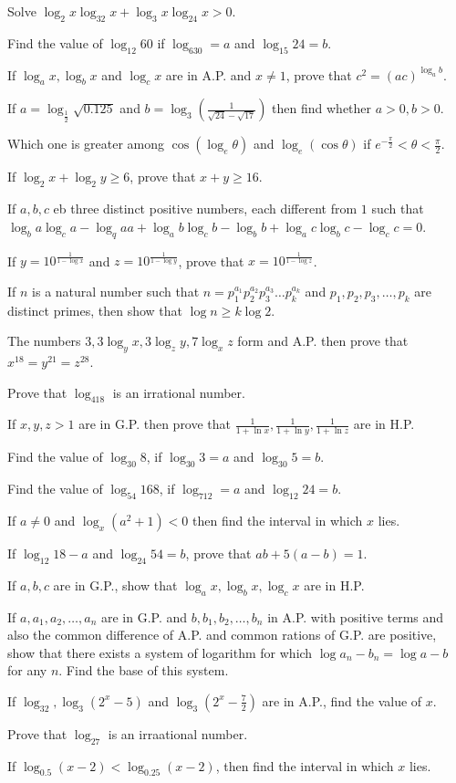 \item Solve $\log_2x\log_32x + \log_3x\log_24x > 0$.
\item Find the value of $\log_{12}60$ if $\log_630 = a$ and $\log_{15}24 = b$.
\item If $\log_ax, \log_bx$ and $\log_cx$ are in A.P. and $x\neq 1$, prove that $c^2 = (ac)^{\log_ab}$.
\item If $a = \log_{\frac{1}{2}}\sqrt{0.125}$ and $b = \log_3\left(\frac{1}{\sqrt{24} - \sqrt{17}}\right)$ then find whether $a >0,
  b> 0$.
\item Which one is greater among $\cos(\log_e\theta)$ and $\log_e(\cos\theta)$ if $e^{-\frac{\pi}{2}} < \theta < \frac{\pi}{2}$.
\item If $\log_2x + \log_2y \geq 6$, prove that $x + y\geq 16$.
\item If $a,b,c$ eb three distinct positive numbers, each different from $1$ such that $\log_ba\log_ca - \log_qaa + \log_ab\log_cb
  - \log_bb + \log_ac\log_bc - \log_cc = 0$.
\item If $y = 10^{\frac{1}{1 - \log x}}$ and $z = 10^{\frac{1}{1 - \log y}}$, prove that $x = 10^{\frac{1}{1 - \log z}}$.
\item If $n$ is a natural number such that $n = p_1^{a_1}p_2^{a_2}p_3^{a_3}\ldots p_k^{a_k}$ and $p_1, p_2, p_3, \ldots, p_k$ are
  distinct primes, then show that $\log n\geq k\log 2$.
\item The numbers $3, 3\log_yx, 3\log_zy, 7\log_xz$ form and A.P. then prove that $x^{18} = y^{21} = z^{28}$.
\item Prove that $\log_418$ is an irrational number.
\item If $x, y, z> 1$ are in G.P. then prove that $\frac{1}{1+ \ln x}, \frac{1}{1 + \ln y}, \frac{1}{1 + \ln z}$ are in H.P.
\item Find the value of $\log_{30}8$, if $\log_{30}3 = a$ and $\log_{30}5 = b$.
\item Find the value of $\log_{54}168$, if $\log_712 = a$ and $\log_{12}24 = b$.
\item If $a\neq 0$ and $\log_x(a^2 + 1) < 0$ then find the interval in which $x$ lies.
\item If $\log_{12}18 - a$ and $\log_{24}54=b$, prove that $ab + 5(a - b) = 1$.
\item If $a,b,c$ are in G.P., show that $\log_ax, \log_bx, \log_cx$ are in H.P.
\item If $a, a_1, a_2, \ldots, a_n$ are in G.P. and $b, b_1, b_2, \ldots, b_n$ in A.P. with positive terms and also the common
  difference of A.P. and common rations of G.P. are positive, show that there exists a system of logarithm for which $\log a_n -
  b_n = \log a - b$ for any $n$. Find the base of this system.
\item If $\log_32, \log_3(2^x - 5)$ and $\log_3\left(2^x - \frac{7}{2}\right)$ are in A.P., find the value of $x$.
\item Prove that $\log_27$ is an irraational number.
\item If $\log_{0.5}(x - 2) < \log_{0.25}(x - 2)$, then find the interval in which $x$ lies.
\stopitemize
